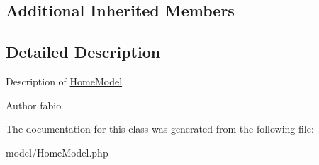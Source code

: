 \subsection*{Additional Inherited Members}


\subsection{Detailed Description}
Description of \hyperlink{classHomeModel}{Home\+Model}

\begin{DoxyAuthor}{Author}
fabio 
\end{DoxyAuthor}


The documentation for this class was generated from the following file\+:\begin{DoxyCompactItemize}
\item 
model/Home\+Model.\+php\end{DoxyCompactItemize}
